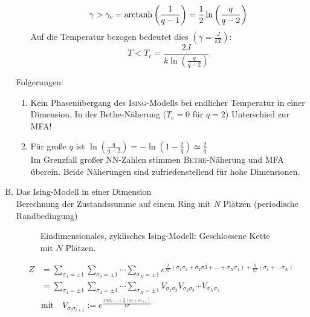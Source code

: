 \begin{enumerate}[A)]
\begin{enumerate}
        \begin{equation}
            \gamma > \gamma_c = \operatorname{arctanh} \left( \frac{1}{q - 1} \right) = \frac{1}{2} \ln \left( \frac{q}{q - 2} \right)
        \end{equation}
        Auf die Temperatur bezogen bedeutet dies $ \left( \gamma = \frac{J}{k T} \right)$:
        \begin{equation}
            T < T_c = \frac{2 J}{k \ln \left( \frac{q}{q-2} \right) }
        \end{equation}
    \end{enumerate}
    Folgerungen:
    \begin{enumerate}
        \item Kein Phasenübergang des \textsc{Ising}-Modells bei endlicher Temperatur in einer Dimension, In der Bethe-Näherung ($T_c = 0$ für $q = 2$)
        Unterschied zur MFA!
        \item Für große $q$ ist $\ln \left( \frac{q}{q-2} \right) = - \ln \left( 1 - \frac{2}{q} \right) \simeq \frac{2}{q}$ \\
        Im Grenzfall großer NN-Zahlen stimmen \textsc{Bethe}-Näherung und MFA überein. Beide Näherungen sind zufriedenstellend für hohe Dimensionen.
    \end{enumerate}
    \item Das Ising-Modell in einer Dimension \\
    Berechnung der Zustandssumme auf einem Ring mit $N$ Plätzen (periodische Randbedingung) \\
    \begin{figure}[H]
        \centering
        \def\svgwidth{0.35\textwidth}
        
        \caption{Eindimensionales, zyklisches Ising-Modell: Geschlossene Kette mit $N$ Plätzen.}
        \label{img:IsingRing}
\end{figure}
    \begin{equation}
        \begin{split}
            Z &= \sum_{\sigma_1 = \pm 1} \sum_{\sigma_2 = \pm 1} \cdots \sum_{\sigma_N = \pm 1} e^{\frac{J}{k T} \left( \sigma_1 \sigma_2 + \sigma_2 \sigma3 + \ldots + \sigma_N \sigma_1 \right) + \frac{h}{k T} \left( \sigma_1 + \ldots \sigma_N \right)} \\
            &=\sum_{\sigma_1 = \pm 1} \sum_{\sigma_2 = \pm 1} \cdots \sum_{\sigma_N = \pm 1} V_{\sigma_1 \sigma_2} V_{\sigma_2 \sigma_3} \cdots V_{\sigma_N \sigma_1}  \\
            & \text{mit} \quad V_{\sigma_l \sigma_{l+1}} := e^{\frac{J \sigma_l \sigma_{l+1} + \frac{h}{2} \left( \sigma_l + \sigma_{l+1} \right) }{k T}}

\end{split}
\end{equation}
\end{enumerate}
